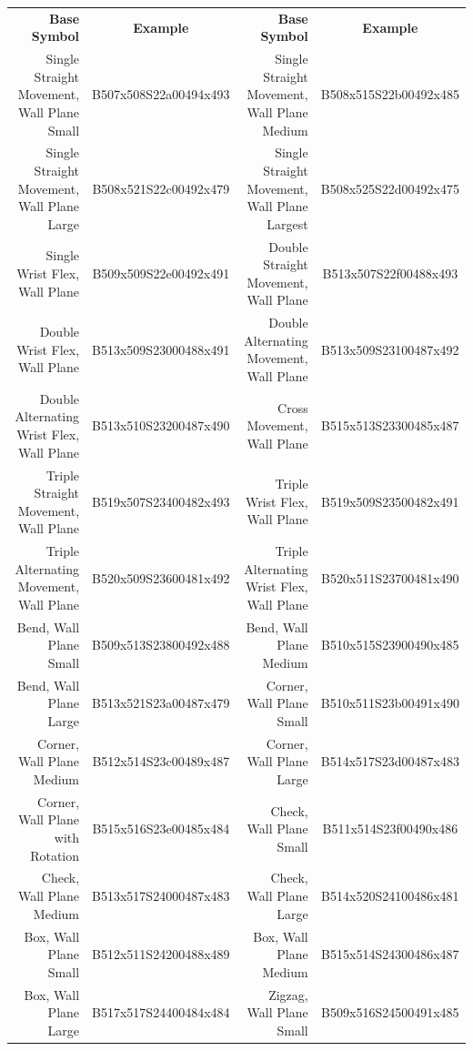 \documentclass{article}
\begin{document}
\begin{center}
\begin{tabular}{rcrc}
\textbf{Base Symbol}&\textbf{Example}&\textbf{Base Symbol}&\textbf{Example}\\
Single Straight Movement, Wall Plane Small&B507x508S22a00494x493&Single Straight Movement, Wall Plane Medium &B508x515S22b00492x485\\
Single Straight Movement, Wall Plane Large&B508x521S22c00492x479&Single Straight Movement, Wall Plane Largest&B508x525S22d00492x475\\
Single Wrist Flex, Wall Plane             &B509x509S22e00492x491&Double Straight Movement, Wall Plane        &B513x507S22f00488x493\\
Double Wrist Flex, Wall Plane             &B513x509S23000488x491&Double Alternating Movement, Wall Plane     &B513x509S23100487x492\\
Double Alternating Wrist Flex, Wall Plane &B513x510S23200487x490&Cross Movement, Wall Plane                  &B515x513S23300485x487\\
Triple Straight Movement, Wall Plane      &B519x507S23400482x493&Triple Wrist Flex, Wall Plane               &B519x509S23500482x491\\
Triple Alternating Movement, Wall Plane   &B520x509S23600481x492&Triple Alternating Wrist Flex, Wall Plane   &B520x511S23700481x490\\
Bend, Wall Plane Small                    &B509x513S23800492x488&Bend, Wall Plane Medium                     &B510x515S23900490x485\\
Bend, Wall Plane Large                    &B513x521S23a00487x479&Corner, Wall Plane Small                    &B510x511S23b00491x490\\
Corner, Wall Plane Medium                 &B512x514S23c00489x487&Corner, Wall Plane Large                    &B514x517S23d00487x483\\
Corner, Wall Plane with Rotation          &B515x516S23e00485x484&Check, Wall Plane Small                     &B511x514S23f00490x486\\
Check, Wall Plane Medium                  &B513x517S24000487x483&Check, Wall Plane Large                     &B514x520S24100486x481\\
Box, Wall Plane Small                     &B512x511S24200488x489&Box, Wall Plane Medium                      &B515x514S24300486x487\\
Box, Wall Plane Large                     &B517x517S24400484x484&Zigzag, Wall Plane Small                    &B509x516S24500491x485\\

\end{tabular}
\end{center}
\end{document}
